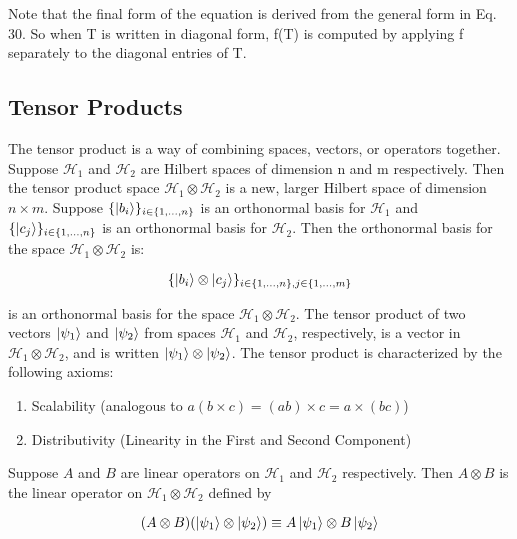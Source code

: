 \documentclass[12pt]{article}
\begin{document}
Note that the final form of the equation is derived from the general form in Eq. 30. So when T is written in diagonal form, f(T) is computed by applying f separately to the diagonal entries of T.

\subsection{Tensor Products}

The tensor product is a way of combining spaces, vectors, or operators together. Suppose \(\mathcal{H}_1\) and \(\mathcal{H}_2\) are Hilbert spaces of dimension n and m respectively. Then the tensor product space \(\mathcal{H}_1 \otimes \mathcal{H}_2\)  is a new, larger Hilbert space of dimension \(n \times m\). Suppose \(\{\ket{b_i}\}_{i \in \{1,...,n\}}\) is an orthonormal basis for \(\mathcal{H}_1\) and \(\{\ket{c_j}\}_{i \in \{1,...,n\}}\) is an orthonormal basis for \(\mathcal{H}_2\). Then the orthonormal basis for the space \(\mathcal{H}_1 \otimes \mathcal{H}_2\) is:

\begin{equation}
    \{\ket{b_i} \otimes \ket{c_j}\}_{i \in \{1,...,n\}, j \in \{1,...,m\}}
\end{equation}

is an orthonormal basis for the space \( \mathcal{H}_1 \otimes \mathcal{H}_2 \). The tensor product of two vectors \( \ket{\psi_1} \) and \( \ket{\psi_2} \) from spaces \( \mathcal{H}_1 \) and \( \mathcal{H}_2 \), respectively, is a vector in \( \mathcal{H}_1 \otimes \mathcal{H}_2 \), and is written \( \ket{\psi_1} \otimes \ket{\psi_2} \). The tensor product is characterized by the following axioms:

\begin{enumerate}
    \item Scalability (analogous to \(a(b \times c) = (ab) \times c = a \times (bc) \))
    \item Distributivity (Linearity in the First and Second Component)
\end{enumerate}

Suppose \( A \) and \( B \) are linear operators on \( \mathcal{H}_1 \) and \( \mathcal{H}_2 \) respectively. Then \( A \otimes B \) is the linear operator on \( \mathcal{H}_1 \otimes \mathcal{H}_2 \) defined by

\begin{equation}
    (A \otimes B)(\ket{\psi_1} \otimes \ket{\psi_2}) \equiv A \ket{\psi_1} \otimes B \ket{\psi_2}
\end{equation}
\end{document}
